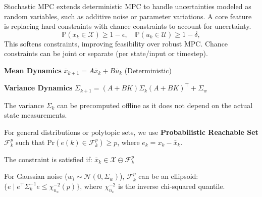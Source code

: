 Stochastic MPC extends deterministic MPC to handle uncertainties
modeled as random variables, such as additive noise or parameter
variations. A core feature is replacing hard constraints with chance
constraints to account for uncertainty.
\[
  \mathbb{P}(x_k \in \mathcal{X}) \geq 1 - \epsilon, \quad
  \mathbb{P}(u_k \in \mathcal{U}) \geq 1 - \delta,
\]
This softens constraints, improving feasibility over robust MPC.
Chance constraints can be joint or separate (per state/input or timestep).

\textbf{Mean Dynamics}
$\bar{x}_{k+1} = A\bar{x}_k + B\bar{u}_k$ (Deterministic)

\textbf{Variance Dynamics}
$\Sigma_{k+1} = (A+BK)\Sigma_k(A+BK)^\top + \Sigma_w$

The variance $\Sigma_k$ can be precomputed offline
as it does not depend on the actual state measurements.

For general distributions or polytopic sets, we use
\textbf{Probabilistic Reachable Set}
$\mathcal{F}_k^p$ such that
$\text{Pr}(e(k) \in \mathcal{F}_k^p) \geq p$,
where $e_k = x_k - \bar{x}_k$.

The constraint is satisfied if:
$\bar{x}_k \in \mathcal{X} \ominus \mathcal{F}_k^p$

For Gaussian noise ($w_i \sim \mathcal{N}(0, \Sigma_w)$),
$\mathcal{F}_k^p$ can be an ellipsoid: $\{e \mid e^\top \Sigma_k^{-1}
e \leq \chi_{n_x}^{-2}(p)\}$, where $\chi_{n_x}^{-2}$ is the inverse
chi-squared quantile.

